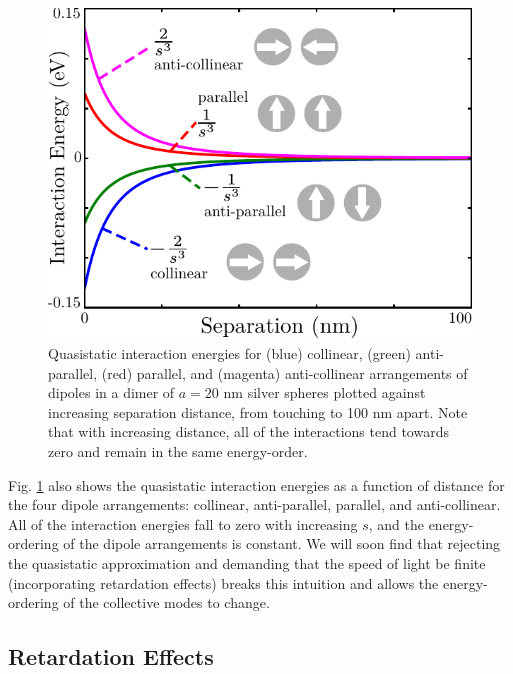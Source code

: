 \documentclass [11pt, proquest] {uwthesis}[2016/11/22]
\begin{document}
\begin{figure}
\begin{centering}
\includegraphics{dimer_stat.pdf}
\caption{Quasistatic interaction energies for (blue) collinear, (green) anti-parallel, (red) parallel, and (magenta) anti-collinear arrangements of dipoles in a dimer of $a=20$ nm silver spheres plotted against increasing separation distance, from touching to 100 nm apart. Note that with increasing distance, all of the interactions tend towards zero and remain in the same energy-order.}
\label{dimer_stat}
\end{centering}
\end{figure}

Fig. \ref{dimer_stat} also shows the quasistatic interaction energies as a function of distance for the four dipole arrangements: collinear, anti-parallel, parallel, and anti-collinear. All of the interaction energies fall to zero with increasing $s$, and the energy-ordering of the dipole arrangements is constant. We will soon find that rejecting the quasistatic approximation and demanding that the speed of light be finite (incorporating retardation effects) breaks this intuition and allows the energy-ordering of the collective modes to change.

\subsection{Retardation Effects}
\end{document}
